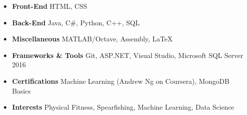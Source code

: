 \documentclass[11pt]{article} %
\begin{document}
		\begin{itemize}[noitemsep,nolistsep, label={}]
			\item \textbf{Front-End}                  \tabto*{5cm} HTML, CSS
			\item \textbf{Back-End}                   \tabto*{5cm} Java, C\#, Python, C++, SQL
			\item \textbf{Miscellaneous}            \tabto*{5cm} MATLAB/Octave, Assembly, \LaTeX
			\item \textbf{Frameworks \& Tools}  \tabto*{5cm} Git, ASP.NET, Visual Studio, Microsoft SQL Server 2016
			\item \textbf{Certifications}              \tabto*{5cm} Machine Learning (Andrew Ng on Coursera), MongoDB Basics
			\item \textbf{Interests}                     \tabto*{5cm} Physical Fitness, Spearfishing, Machine Learning, Data Science
		\end{itemize}
		
		\vspace{.1cm}
	
\end{document}
